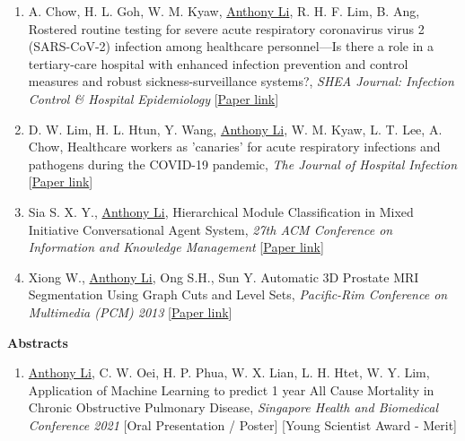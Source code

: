 \documentclass[letterpaper,10pt,oneside]{article}
\begin{document}
\begin{body}
\begin{enumerate}
\item A. Chow, H. L. Goh, W. M. Kyaw, \underline{Anthony Li}, R. H. F. Lim, B. Ang, \textcolor{mygray}{Rostered routine testing for severe acute respiratory coronavirus virus 2 (SARS-CoV-2) infection among healthcare personnel—Is there a role in a tertiary-care hospital with enhanced infection prevention and control measures and robust sickness-surveillance systems?}, \textit{SHEA Journal: Infection Control \& Hospital Epidemiology} [\href{https://www.cambridge.org/core/journals/infection-control-and-hospital-epidemiology/article/rostered-routine-testing-for-severe-acute-respiratory-coronavirus-virus-2-sarscov2-infection-among-healthcare-personnelis-there-a-role-in-a-tertiarycare-hospital-with-enhanced-infection-prevention-and-control-measures-and-robust-sicknesssurveillance-systems/30E175AEA1FBA0080DBB281D436D477B}{Paper link}]

\item D. W. Lim, H. L. Htun, Y. Wang, \underline{Anthony Li}, W. M. Kyaw, L. T. Lee, A. Chow, \textcolor{mygray}{Healthcare workers as 'canaries' for acute respiratory infections and pathogens during the COVID-19 pandemic}, \textit{The Journal of Hospital Infection} [\href{https://www.journalofhospitalinfection.com/article/S0195-6701(21)00140-7/fulltext}{Paper link}]

\item Sia S. X. Y., \underline{Anthony Li}, \textcolor{mygray}{Hierarchical Module Classification in Mixed Initiative Conversational Agent System}, \textit{27th ACM Conference on Information and Knowledge Management}
[\href{https://dl.acm.org/citation.cfm?id=3133185}{Paper link}]

\item Xiong W., \underline{Anthony Li}, Ong S.H., Sun Y. \textcolor{mygray}{Automatic 3D Prostate MRI Segmentation Using Graph Cuts and Level Sets}, \textit{Pacific-Rim Conference on Multimedia (PCM) 2013}
[\href{https://link.springer.com/chapter/10.1007/978-3-319-03731-8_20}{Paper link}]
\end{enumerate}

\textbf{Abstracts}
\GapNoBreak
{}

\begin{enumerate}

\item \underline{Anthony Li}, C. W. Oei, H. P. Phua, W. X. Lian, L. H. Htet, W. Y. Lim, \textcolor{mygray}{Application of Machine Learning to predict 1 year All Cause Mortality in Chronic Obstructive Pulmonary Disease}, \textit{Singapore Health and Biomedical Conference 2021} [Oral Presentation / Poster] [Young Scientist Award - Merit]


\end{enumerate}
\end{body}
\end{document}
